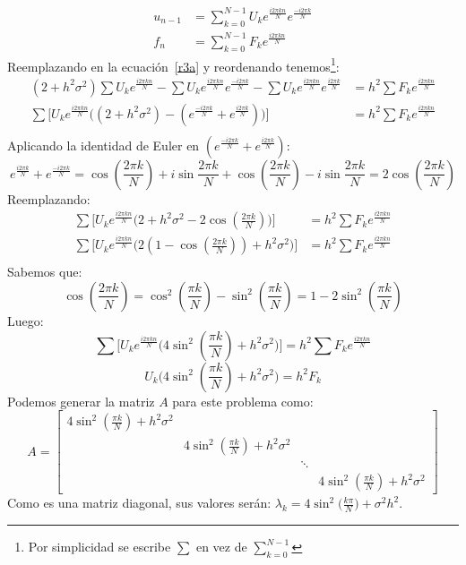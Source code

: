 \documentclass{article}
\begin{document}
\begin{enumerate}
\begin{align*}
        u_{n-1} &= 
            \sum_{k=0}^{N-1} U_ke^{\frac{i2\pi kn}{N}}e^{\frac{-i2\pi k}{N}}\\
        f_n &= \sum_{k=0}^{N-1} F_ke^{\frac{i2\pi kn}{N}}
    \end{align*}
    Reemplazando en la ecuación~\ref{r3a} y reordenando tenemos\footnote{
    Por simplicidad se escribe $\sum$ en vez de $\sum_{k=0}^{N-1}$}:
    \begin{align*}
        (2+h^2\sigma^2)\sum U_ke^{\frac{i2\pi kn}{N}} - 
        \sum U_ke^{\frac{i2\pi kn}{N}} e^{\frac{-i2\pi k}{N}} -
        \sum U_ke^{\frac{i2\pi kn}{N}} e^{\frac{i2\pi k}{N}}
        &= h^2 \sum F_ke^{\frac{i2\pi kn}{N}} \\
        \sum\Big[ U_ke^{\frac{i2\pi kn}{N}} \big(
        (2+h^2\sigma^2) - (e^{\frac{-i2\pi k}{N}} + e^{\frac{i2\pi k}{N}})
        \big) \Big] &= h^2 \sum F_ke^{\frac{i2\pi kn}{N}} \\
    \end{align*}
    Aplicando la identidad de Euler en 
    $(e^{\frac{-i2\pi k}{N}} + e^{\frac{i2\pi k}{N}})$:
    $$  e^{\frac{i2\pi k}{N}} + e^{\frac{-i2\pi k}{N}} = 
        \cos(\frac{2\pi k}{N}) + i\sin{\frac{2\pi k}{N}} + 
        \cos(\frac{2\pi k}{N}) - i\sin{\frac{2\pi k}{N}} = 
        2 \cos(\frac{2\pi k}{N})  $$
    Reemplazando:
    \begin{align*}
        \sum\Big[ U_ke^{\frac{i2\pi kn}{N}} \big(
        2 + h^2\sigma^2 - 2\cos (\frac{2\pi k}{N})
        \big) \Big] &= h^2 \sum F_ke^{\frac{i2\pi kn}{N}} \\
        \sum\Big[ U_ke^{\frac{i2\pi kn}{N}} \big(
        2 (1 - \cos (\frac{2\pi k}{N})) + h^2\sigma^2
        \big) \Big] &= h^2 \sum F_ke^{\frac{i2\pi kn}{N}} \\
    \end{align*}
    Sabemos que:
    $$  \cos (\frac{2\pi k}{N}) = 
        \cos^2 (\frac{\pi k}{N}) - \sin^2 (\frac{\pi k}{N}) = 
        1 - 2\sin^2 (\frac{\pi k}{N})  $$
    Luego:
    $$ \sum\Big[ U_ke^{\frac{i2\pi kn}{N}} \big(
        4\sin^2 (\frac{\pi k}{N}) + h^2\sigma^2
        \big) \Big] = h^2 \sum F_ke^{\frac{i2\pi kn}{N}} $$
    $$ U_k \big(4\sin^2 (\frac{\pi k}{N}) + h^2\sigma^2 \big) = h^2 F_k $$
    Podemos generar la matriz $A$ para este problema como:
    $$ A =
    \begin{bmatrix}
        4\sin^2 (\frac{\pi k}{N}) + h^2\sigma^2 & & &  \\
         & 4\sin^2 (\frac{\pi k}{N}) + h^2\sigma^2 & & \\
         & & \ddots & \\
        &  & & 4\sin^2 (\frac{\pi k}{N}) + h^2\sigma^2
    \end{bmatrix}
    $$
    Como es una matriz diagonal, sus valores serán:
    $\lambda_k = 4\sin^2\Big(\frac{k\pi}{N}\Big) + \sigma^2h^2$.
    

\end{enumerate}
\end{document}
